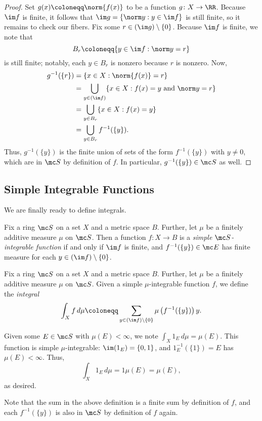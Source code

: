 \documentclass[../notes.tex]{subfiles}
\begin{document}
\begin{proof}
	Set $g(x)\coloneqq\norm{f(x)}$ to be a function $g\colon X\to\RR$. Because $\im f$ is finite, it follows that $\im g=\{\norm y:y\in\im f\}$ is still finite, so it remains to check our fibers. Fix some $r\in(\im g)\setminus\{0\}$. Because $\im f$ is finite, we note that
	\[B_r\coloneqq\{y\in\im f:\norm y=r\}\]
	is still finite; notably, each $y\in B_r$ is nonzero because $r$ is nonzero. Now,
	\begin{align*}
		g^{-1}(\{r\}) &= \{x\in X:\norm{f(x)}=r\} \\
		&= \bigcup_{y\in(\im f)}\{x\in X:f(x)=y\text{ and }\norm y=r\} \\
		&= \bigcup_{y\in B_r}\{x\in X:f(x)=y\} \\
		&= \bigcup_{y\in B_r}f^{-1}(\{y\}).
	\end{align*}
	Thus, $g^{-1}(\{y\})$ is the finite union of sets of the form $f^{-1}(\{y\})$ with $y\ne0$, which are in $\mc S$ by definition of $f$. In particular, $g^{-1}(\{y\})\in\mc S$ as well.
\end{proof}

\subsection{Simple Integrable Functions}
We are finally ready to define integrals.
\begin{definition}
	Fix a ring $\mc S$ on a set $X$ and a metric space $B$. Further, let $\mu$ be a finitely additive measure $\mu$ on $\mc S$. Then a function $f\colon X\to B$ is a \textit{simple $\mc S$-integrable function} if and only if $\im f$ is finite, and $f^{-1}(\{y\})\in\mc E$ has finite measure for each $y\in(\im f)\setminus\{0\}$.
\end{definition}
\begin{definition}[Integral]
	Fix a ring $\mc S$ on a set $X$ and a metric space $B$. Further, let $\mu$ be a finitely additive measure $\mu$ on $\mc S$. Given a simple $\mu$-integrable function $f$, we define the \textit{integral}
	\[\int_Xf\,d\mu\coloneqq\sum_{y\in(\im f)\setminus\{0\}}\mu\left(f^{-1}(\{y\})\right)y.\]
\end{definition}
\begin{example} \label{ex:integrate-indicator}
	Given some $E\in\mc S$ with $\mu(E)<\infty$, we note $\int_X1_E\,d\mu=\mu(E)$. This function is simple $\mu$-integrable: $\im(1_E)=\{0,1\}$, and $1_E^{-1}(\{1\})=E$ has $\mu(E)<\infty$. Thus,
	\[\int_X1_E\,d\mu=1\mu(E)=\mu(E),\]
	as desired.
\end{example}
Note that the sum in the above definition is a finite sum by definition of $f$, and each $f^{-1}(\{y\})$ is also in $\mc S$ by definition of $f$ again.
\end{document}
